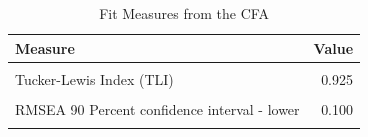 \documentclass[
]{article}
\begin{document}
\begin{table}[!h]

\caption{\label{tab:unnamed-chunk-17}Fit Measures from the CFA}
\centering
\begin{tabular}[t]{lr}
\toprule
Measure & Value\\
\midrule
\cellcolor{gray!6}{Comparative Fit Index (CFI)} & \cellcolor{gray!6}{0.954}\\
Tucker-Lewis Index (TLI) & 0.925\\
\cellcolor{gray!6}{Root Mean Square Error of Approximation(RMSEA)} & \cellcolor{gray!6}{0.074}\\
RMSEA 90 Percent confidence interval - lower & 0.100\\
\cellcolor{gray!6}{RMSEA 90 Percent confidence interval - upper} & \cellcolor{gray!6}{0.050}\\
\bottomrule
\end{tabular}
\end{table}

\newpage
\end{document}

